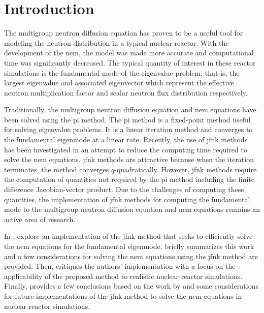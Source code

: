 \section{Introduction}
\label{sec:introduction}

  The multigroup neutron diffusion equation has proven to be a useful tool for
  modeling the neutron distribution in a typical nuclear reactor. With the
  development of the \gls{nem}, the model was made more accurate and
  computational time was significantly decreased. The typical quantity of
  interest in these reactor simulations is the fundamental mode of the
  eigenvalue problem; that is, the largest eigenvalue and associated eigenvector
  which represent the effective neutron multiplication factor and scalar neutron
  flux distribution respectively.

  Traditionally, the multigroup neutron diffusion equation and \gls{nem}
  equations have been solved using the \gls{pi} method. The \gls{pi} method is a
  fixed-point method useful for solving eigenvalue problems. It is a linear
  iteration method and converges to the fundamental eigenmode at a linear rate.
  Recently, the use of \gls{jfnk} methods has been investigated in an attempt to
  reduce the computing time required to solve the \gls{nem} equations.
  \gls{jfnk} methods are attractive because when the iteration terminates, the
  method converges $q$-quadratically. However, \gls{jfnk} methods require the
  computation of quantities not required by the \gls{pi} method including the
  finite difference Jacobian-vector product. Due to the challenges of computing
  these quantities, the implementation of \gls{jfnk} methods for computing the
  fundamental mode to the multigroup neutron diffusion equation and \gls{nem}
  equations remains an active area of research.

  In , \citeauthor{qe2paper} explore an implementation of
  the \gls{jfnk} method that seeks to efficiently solve the \gls{nem} equations
  for the fundamental eigenmode.  briefly summarizes this work
  and a few considerations for solving the \gls{nem} equations using the
  \gls{jfnk} method are provided. Then,  critiques the
  authors' implementation with a focus on the applicability of the proposed
  method to realistic nuclear reactor simulations. Finally,
   provides a few conclusions based on the work by
  \citeauthor{qe2paper} and some considerations for future implementations of
  the \gls{jfnk} method to solve the \gls{nem} equations in nuclear reactor
  simulations.
